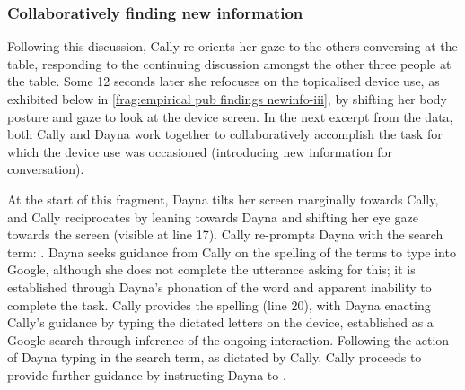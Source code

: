 





\crpagebreak\subsubsection{Collaboratively finding new information}\label{sec:empirical pub findings newinfo collab-finding}
\begin{revisedsubmission}
Following this discussion, Cally re-orients her gaze to the others conversing at the table, responding to the continuing discussion amongst the other three people at the table.
Some 12 seconds later she refocuses on the topicalised device use, as exhibited below in \autoref{frag:empirical pub findings newinfo-iii}, by shifting her body posture and gaze to look at the device screen.
In the next excerpt from the data, both Cally and Dayna work together to collaboratively accomplish the task for which the device use was occasioned (introducing new information for conversation).

At the start of this fragment, Dayna tilts her screen marginally towards Cally, and Cally reciprocates by leaning towards Dayna and shifting her eye gaze towards the screen (visible at line 17).
Cally re-prompts Dayna with the search term: .
Dayna seeks guidance from Cally on the spelling of the terms to type into Google, although she does not complete the utterance asking for this; it is established through Dayna’s phonation of the word  and apparent inability to complete the task.
Cally provides the spelling (line 20), with Dayna enacting Cally’s guidance by typing the dictated letters on the device, established as a Google search through inference of the ongoing interaction.
Following the action of Dayna typing in the search term, as dictated by Cally, Cally proceeds to provide further guidance by instructing Dayna to .


\end{revisedsubmission}
